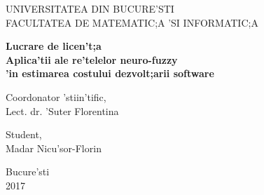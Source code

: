 \begin{center}
\large
UNIVERSITATEA DIN BUCURE'STI\\
FACULTATEA DE MATEMATIC;A 'SI INFORMATIC;A\\
\end{center}

\vspace{1.5cm}

\begin{center}
\textbf{
{\LARGE Lucrare de licen't;a\\
\medskip
Aplica'tii ale re'telelor neuro-fuzzy\\
 'in estimarea costului dezvolt;arii software\\}}
\end{center}

\vspace{7cm}

\begin{minipage}{\textwidth}
\Large
Coordonator 'stiin'tific,\\
Lect. dr. 'Suter Florentina
\begin{flushright}
\Large
Student,\\
Madar Nicu'sor-Florin
\end{flushright}
\end{minipage}

\vspace{2cm}
\begin{center}
\Large
Bucure'sti\\
2017
\end{center}





